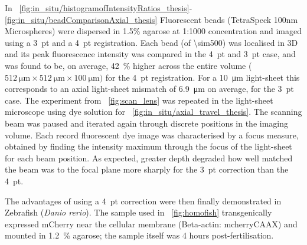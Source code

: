 In \figurename~\ref{fig:in_situ/histogramofIntensityRatios_thesis}-\ref{fig:in_situ/beadComparisonAxial_thesis} Fluorescent beads (TetraSpeck 100nm Microspheres) were dispersed in 1.5\% agarose at 1:1000 concentration and imaged using a 3~pt and a 4~pt registration.
Each bead (of \SI{\sim500}{}) was localised in \gls{3D} %
and its peak fluorescence intensity was compared in the 4~pt and 3~pt case, and was found to be, on average,
\SI{42}{\percent} higher across the entire volume (\(\SI{512}{\micro\metre} \times \SI{512}{\micro\metre}\times \SI{100}{\micro\metre})\) for the 4~pt registration.
For a \SI{10}{\micro\metre} \gls{light-sheet} this corresponds to an axial light-sheet mismatch of \SI{6.9}{\micro\metre} on average, for the 3~pt case. %
The experiment from \figurename~\ref{fig:scan_lens} was repeated in the \gls{light-sheet} microscope using dye solution for \figurename~\ref{fig:in_situ/axial_travel_thesis}.
The scanning beam was paused and iterated again through discrete positions in the imaging volume.
Each record fluorescent dye image was characterised by a focus measure, obtained by finding the intensity maximum through the focus of the light-sheet for each beam position.
As expected, greater depth degraded how well matched the beam was to the focal plane more sharply for the 3~pt correction than the 4~pt.

The advantages of using a 4~pt correction were then finally demonstrated in Zebrafish (\emph{Danio rerio}).
The sample used in \figurename~\ref{fig:homofish} transgenically expressed mCherry near the cellular membrane (Beta-actin: mcherryCAAX) and mounted in 1.2~\% agarose;
the sample itself was 4 hours post-fertilisation.

